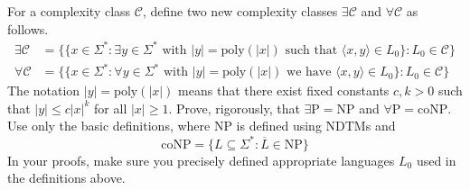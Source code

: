 \documentclass[12pt]{article}
\begin{document}
 


\begin{problem}{1}
    For a complexity class $\mathcal{C}$, define two new complexity classes $\exists \mathcal{C}$ and $\forall \mathcal{C}$ as follows.
    \begin{align*}
        \exists \mathcal{C} &= \{ \{ x \in \Sigma^* : \exists y \in \Sigma^* \text{ with } |y| = \text{poly}(|x|) \text{ such that } \langle x, y \rangle \in L_0 \} : L_0 \in \mathcal{C} \} \\
        \forall \mathcal{C} &= \{ \{ x \in \Sigma^* : \forall y \in \Sigma^* \text{ with } |y| = \text{poly}(|x|) \text{ we have } \langle x, y \rangle \in L_0 \} : L_0 \in \mathcal{C} \}
    \end{align*}
    The notation $|y| = \text{poly}(|x|)$ means that there exist fixed constants $c, k > 0$ such that $|y| \leq c |x|^k$ for all $| x | \geq 1$. Prove, rigorously, that $\exists \text{P} = \text{NP}$ and $\forall \text{P} = \text{coNP}$. \\ 
    Use only the basic definitions, where NP is defined using NDTMs and 
    \[ \text{coNP} = \{L \subseteq \Sigma^* : \overline{L} \in \text{NP}\}\] 
    In your proofs, make sure you precisely defined appropriate languages $L_0$ used in the definitions above.
\end{problem}
\end{document}
